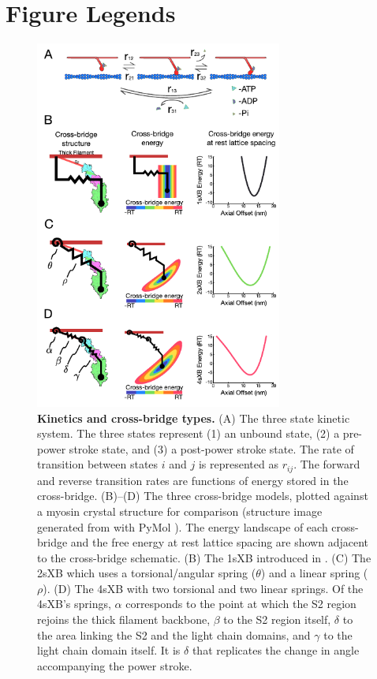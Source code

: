 \documentclass[10pt]{article}
\newcommand{\citep}[1]{\cite{#1}} %
\newcommand{\citet}[1]{\cite{#1}}
\begin{document}
\section*{Figure Legends} %

\clearpage
\begin{figure}[ht]
    \begin{center}
    \includegraphics[width=3.2in]{../imgs/Figure1.pdf}
    \caption{ \textbf{Kinetics and cross-bridge types.} 
        (A)  The three state kinetic system. 
        The three states represent (1) an unbound state, (2) a pre-power stroke state, and (3) a post-power stroke state. 
        The rate of transition between states $i$ and $j$ is represented as $r_{ij}$. 
        The forward and reverse transition rates are functions of energy stored in the cross-bridge. 
        (B)--(D) The three cross-bridge models, plotted against a myosin crystal structure for comparison (structure image generated from \protect\citet{Gourinath2003} with PyMol \protect\citep{pymol}).
        The energy landscape of each cross-bridge and the free energy at rest lattice spacing are shown adjacent to the cross-bridge schematic.
        (B) The 1sXB introduced in \protect\citep{Huxley1957}. 
        (C) The 2sXB which uses a torsional/angular spring ($\theta$) and a linear spring ($\rho$). 
        (D) The 4sXB with two torsional and two linear springs.
        Of the 4sXB's springs, $\alpha$ corresponds to the point at which the S2 region rejoins the thick filament backbone, $\beta$ to the S2 region itself, $\delta$ to the area linking the S2 and the light chain domains, and $\gamma$ to the light chain domain itself.
        It is $\delta$ that replicates the change in angle accompanying the power stroke.
        \label{fig_xb_types}
        }
    \end{center}
\end{figure}
\end{document}
